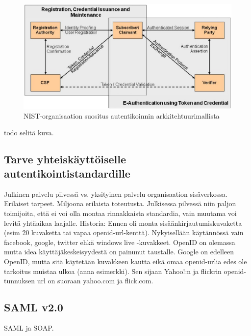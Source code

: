 \documentclass[finnish,gradu]{tktltiki}
\begin{document}
  \begin{figure}
    \centering
    \includegraphics[width=1.0\textwidth]{images/NIST_authentication_architectural_model.jpg}
    \caption{NIST-organisaation suositus autentikoinnin arkkitehtuurimallista \cite{NIST_SP800-63-1} }
    \label{fig:yleiskuva}
  \end{figure}
  todo selitä kuva.


  \subsection{Tarve yhteiskäyttöiselle autentikointistandardille} %
  \label{sub:tarve_yhteiskäyttöiselle_autentikointistandardille}
  Julkinen palvelu pilvessä vs. yksityinen palvelu organisaation sisäverkossa. Erilaiset tarpeet. Miljoona erilaista toteutusta. Julkisessa pilvessä niin paljon toimijoita, että ei voi olla montaa rinnakkaista standardia, vain muutama voi levitä yhtäaikaa laajalle. Historia: Ennen oli monta sisäänkirjautumiskuvaketta (esim 20 kuvaketta tai vapaa openid-url-kenttä). Nykyisellään käytännössä vain facebook, google, twitter ehkä windows live -kuvakkeet. OpenID on olemassa mutta idea käyttäjäkeskeisyydestä on painunut taustalle. Google on edelleen OpenID, mutta sitä käytetään kuvakkeen kautta eikä omaa openid-urlia edes ole tarkoitus muistaa ulkoa (anna esimerkki). Sen sijaan Yahoo!:n ja flickrin openid-tunnuksen url on suoraan yahoo.com ja flick.com.



  \subsection{SAML v2.0} %
  \label{sub:saml_v2_0}
  SAML ja SOAP.
\end{document}
